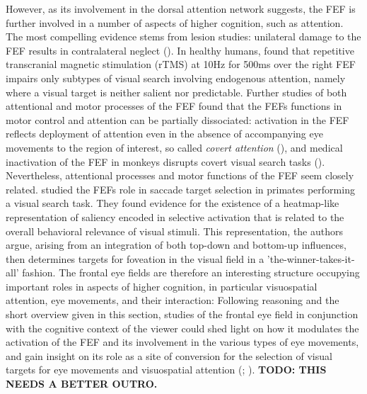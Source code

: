 \documentclass[a4paper, 12pt]{scrreprt}
\begin{document}
However, as its involvement in the dorsal attention network suggests, the FEF is further involved in a number of aspects of higher cognition, such as attention. The most compelling evidence stems from lesion studies: unilateral damage to the FEF results in contralateral neglect (\cite{crowne1981effects}). In healthy humans, \textcite{muggleton2003human} found that repetitive transcranial
magnetic stimulation (rTMS) at 10Hz for 500ms over the right FEF impairs only subtypes of visual search involving endogenous attention, namely where a visual target is neither salient nor predictable. Further studies of both attentional and motor processes of the FEF found that the FEFs functions in motor control and attention can be partially dissociated: activation in the FEF reflects deployment of attention even in the absence of accompanying eye movements to the region of interest, so called \textit{covert attention} (\cite{vossel2014dorsal}), and medical inactivation of the FEF in monkeys disrupts covert visual search tasks (\cite{monosov2009frontal}). Nevertheless, attentional processes and motor functions of the FEF seem closely related. \textcite{thompson2005visual} studied the FEFs role in saccade target selection in primates performing a visual search task. They found evidence for the existence of a heatmap-like representation of saliency encoded in selective activation that is related to the overall behavioral relevance of visual stimuli. This representation, the authors argue, arising from an integration of both top-down and bottom-up influences, then determines targets for foveation in the visual field in a 'the-winner-takes-it-all' fashion. \newline 
The frontal eye fields are therefore an interesting structure occupying important roles in aspects of higher cognition, in particular visuospatial attention, eye movements, and their interaction: Following \textcite{vernet2014corrigendum} reasoning and the short overview given in this section, studies of the frontal eye field in conjunction with the cognitive context of the viewer could shed light on how it modulates the activation of the FEF and its involvement in the various types of eye movements, and gain insight on its role as a site of conversion for the selection of visual targets for eye movements and visuospatial attention (\cite{corbetta2002control}; \cite{kowler2011eye}). \newline
\textbf{TODO: THIS NEEDS A BETTER OUTRO.}
\end{document}
